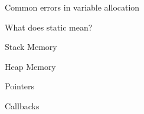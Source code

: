 \documentclass[10pt]{beamer}
\begin{document}
\begin{frame}{Common errors in variable allocation}

\end{frame}

\begin{frame}{What does static mean?}

\end{frame}

\begin{frame}{Stack Memory}

\end{frame}

\begin{frame}{Heap Memory}

\end{frame}

\begin{frame}{Pointers}

\end{frame}

\begin{frame}{Callbacks}

\end{frame}
\end{document}

